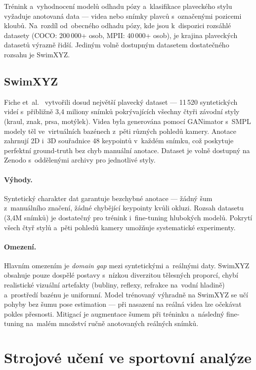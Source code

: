 Trénink a~vyhodnocení modelů odhadu pózy a~klasifikace plaveckého stylu vyžaduje anotovaná data --- videa nebo snímky plavců s~označenými pozicemi kloubů. Na~rozdíl od~obecného odhadu pózy, kde jsou k~dispozici rozsáhlé datasety (COCO: 200\,000+ osob, MPII: 40\,000+ osob), je krajina plaveckých datasetů výrazně řidší. Jediným volně dostupným datasetem dostatečného rozsahu je SwimXYZ.

\subsection{SwimXYZ}
\label{subsec:swimxyz}

Fiche et~al.~\cite{fiche2023swimxyz} vytvořili dosud největší plavecký dataset --- 11\,520 syntetických videí s~přibližně 3{,}4 miliony snímků pokrývajících všechny čtyři závodní styly (kraul, znak, prsa, motýlek). Videa byla generována pomocí GANimator s~SMPL modely těl ve~virtuálních bazénech z~pěti různých pohledů kamery. Anotace zahrnují 2D i~3D souřadnice 48 keypointů v~každém snímku, což poskytuje perfektní ground-truth bez chyb manuální anotace. Dataset je volně dostupný na Zenodo s~oddělenými archivy pro jednotlivé styly.

\paragraph{Výhody.}
Syntetický charakter dat garantuje bezchybné anotace --- žádný šum z~manuálního značení, žádné chybějící keypointy kvůli okluzi. Rozsah datasetu (3{,}4M snímků) je dostatečný pro trénink i~fine-tuning hlubokých modelů. Pokrytí všech čtyř stylů a~pěti pohledů kamery umožňuje systematické experimenty.

\paragraph{Omezení.}
Hlavním omezením je \textit{domain gap} mezi syntetickými a~reálnými daty. SwimXYZ obsahuje pouze dospělé postavy s~nízkou diverzitou tělesných proporcí, chybí realistické vizuální artefakty (bubliny, reflexy, refrakce na~vodní hladině) a~prostředí bazénu je uniformní. Model trénovaný výhradně na SwimXYZ se učí  pohyby bez šumu pose estimation --- při nasazení na reálná videa lze očekávat pokles přesnosti. Mitigací je augmentace šumem při tréninku a~následný fine-tuning na~malém množství ručně anotovaných reálných snímků.

\section{Strojové učení ve sportovní analýze}
\label{sec:ml_sport}

